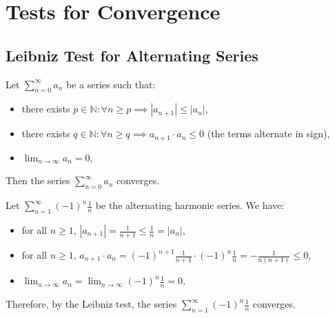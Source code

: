\section{Tests for Convergence}

\subsection{Leibniz Test for Alternating Series}
\begin{theorem}
    Let $\sum_{n=0}^{\infty} a_n$ be a series such that:
    \begin{itemize}[itemsep=1pt,label=$\circ$]
        \item there exists $p \in \mathbb{N}: \forall n \geq p \implies |a_{n + 1}| \leq |a_n|$,
        \item there exists $q \in \mathbb{N}: \forall n \geq q \implies a_{n + 1} \cdot a_n \leq 0$ (the terms alternate in sign),
        \item $\lim_{n \to \infty} a_n = 0$,
    \end{itemize}
    Then the series $\sum_{n=0}^{\infty} a_n$ converges.
\end{theorem}
\begin{eg}
    Let $\sum_{n = 1}^{\infty} (-1)^n \frac{1}{n}$ be the alternating harmonic series. We have:
    \begin{itemize}[itemsep=1pt,label=$\circ$]
        \item for all $n \geq 1$, $|a_{n + 1}| = \frac{1}{n + 1} \leq \frac{1}{n} = |a_n|$,
        \item for all $n \geq 1$, $a_{n + 1} \cdot a_n = (-1)^{n + 1} \frac{1}{n + 1} \cdot (-1)^n \frac{1}{n} = -\frac{1}{n(n + 1)} \leq 0$,
        \item $\lim_{n \to \infty} a_n = \lim_{n \to \infty} (-1)^n \frac{1}{n} = 0$,
    \end{itemize}
    Therefore, by the Leibniz test, the series $\sum_{n = 1}^{\infty} (-1)^n \frac{1}{n}$ converges.
\end{eg}

